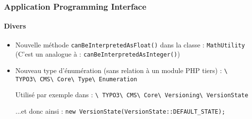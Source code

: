 \begin{frame}[fragile]
	\frametitle{Application Programming Interface}
	\framesubtitle{Divers}

	\begin{itemize}
		\item Nouvelle méthode \texttt{canBeInterpretedAsFloat()} dans la classe : \texttt{MathUtility}\newline
			(C'est un analogue à : \texttt{canBeInterpretedAsInteger()})
		\item Nouveau type d'énumération (sans relation à un module PHP tiers) :\newline
			\texttt{\textbackslash
				TYPO3\textbackslash
				CMS\textbackslash
				Core\textbackslash
				Type\textbackslash
				Enumeration}\newline

			Utilisé par exemple dans :\newline
			\texttt{\textbackslash
				TYPO3\textbackslash
				CMS\textbackslash
				Core\textbackslash
				Versioning\textbackslash
				VersionState}\newline

			...et donc ainsi :\newline
			\texttt{new VersionState(VersionState::DEFAULT\_STATE);}

	\end{itemize}

\end{frame}


